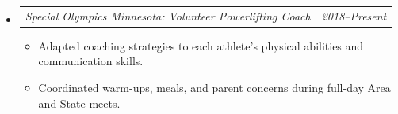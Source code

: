 \documentclass[12pt,letterpaper]{article}
\makeatletter
\newcommand{\headerpair}[2]{
    \begin{tabular*}{\linewidth}{l@{ \extracolsep{\fill} }r} {\large\emph{#1}} & {\large\emph{#2}}
    \end{tabular*}
}
\newcommand{\headerrow}[3]{\headerpair{#2: #1}{#3}}
\newcommand{\CPP}{C\nolinebreak[4]\hspace{-.05em}\raisebox{.22ex}{\footnotesize\bf ++}\xspace}
\makeatother
\begin{document}
\begin{itemize}[leftmargin=\parindent]
\begin{itemize}[leftmargin=\parindent]

        \end{itemize}

    \item[]
        \headerrow
            {Volunteer Powerlifting Coach}
            {Special Olympics Minnesota}
            {2018--Present}
        \begin{itemize}[leftmargin=\parindent]

            \item Adapted coaching strategies to each athlete's physical abilities and communication skills.

            \item Coordinated warm-ups, meals, and parent concerns during full-day Area and State meets.



\end{itemize}
\end{itemize}
\end{document}
